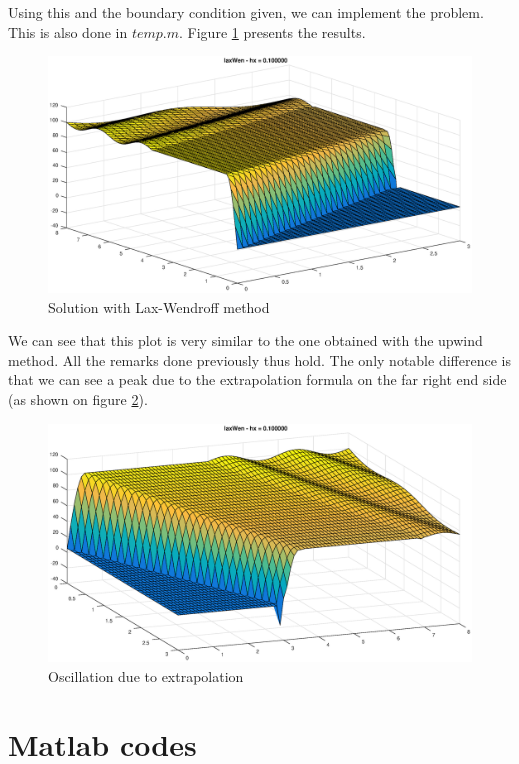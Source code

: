 Using this and the boundary condition given, we can implement the problem. This is also done in $temp.m$. Figure \ref{lw} presents the results. 

\begin{figure}
\begin{center}
\includegraphics[scale=0.4]{laxWen.eps}
\caption{Solution with Lax-Wendroff method}
\label{lw}
\end{center}
\end{figure}

We can see that this plot is very similar to the one obtained with the upwind method. All the remarks done previously thus hold. The only notable difference is that we can see a peak due to the extrapolation formula on the far right end side (as shown on figure \ref{trois}).

\begin{figure}
\begin{center}
\includegraphics[scale=0.4]{fig3.eps}
\caption{Oscillation due to extrapolation}
\label{trois}
\end{center}
\end{figure}

\FloatBarrier

\section*{Matlab codes}


